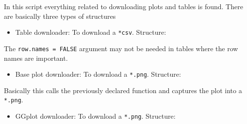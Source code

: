 \documentclass[
]{book}
\newenvironment{Shaded}{\begin{snugshade}}{\end{snugshade}}
\newcommand{\ControlFlowTok}[1]{\textcolor[rgb]{0.13,0.29,0.53}{\textbf{#1}}}
\newcommand{\DataTypeTok}[1]{\textcolor[rgb]{0.13,0.29,0.53}{#1}}
\newcommand{\KeywordTok}[1]{\textcolor[rgb]{0.13,0.29,0.53}{\textbf{#1}}}
\newcommand{\NormalTok}[1]{#1}
\newcommand{\OperatorTok}[1]{\textcolor[rgb]{0.81,0.36,0.00}{\textbf{#1}}}
\newcommand{\OtherTok}[1]{\textcolor[rgb]{0.56,0.35,0.01}{#1}}
\newcommand{\StringTok}[1]{\textcolor[rgb]{0.31,0.60,0.02}{#1}}
\providecommand{\tightlist}{%
  \setlength{\itemsep}{0pt}\setlength{\parskip}{0pt}}
\begin{document}
In this script everything related to downloading plots and tables is found. There are basically three types of structures

\begin{itemize}
\tightlist
\item
  Table downloader: To download a \texttt{*csv}. Structure:
\end{itemize}

\begin{Shaded}
\end{Shaded}

The \texttt{row.names\ =\ FALSE} argument may not be needed in tables where the row names are important.

\begin{itemize}
\tightlist
\item
  Base plot downloader: To download a \texttt{*.png}. Structure:
\end{itemize}

\begin{Shaded}
\end{Shaded}

Basically this calls the previously declared function and captures the plot into a \texttt{*.png}.

\begin{itemize}
\tightlist
\item
  GGplot downloader: To download a \texttt{*.png}. Structure:
\end{itemize}
\end{document}
